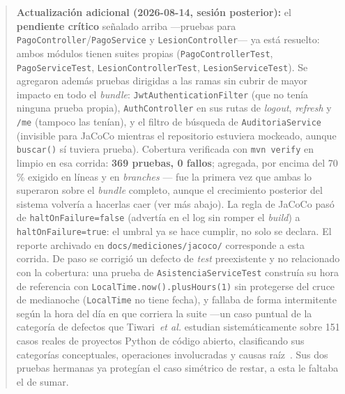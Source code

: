 \documentclass[11pt,a4paper]{article}
\newcommand{\ruta}[1]{\texttt{\footnotesize #1}}
\begin{document}
\begin{quote}
\textbf{Actualización adicional (2026-08-14, sesión posterior):} el
\textbf{pendiente crítico} señalado arriba —pruebas para
\texttt{PagoController}/\texttt{PagoService} y \texttt{LesionController}—
ya está resuelto: ambos módulos tienen suites propias
(\texttt{PagoControllerTest}, \texttt{PagoServiceTest},
\texttt{LesionControllerTest}, \texttt{LesionServiceTest}). Se agregaron
además pruebas dirigidas a las ramas sin cubrir de mayor impacto en todo
el \emph{bundle}: \texttt{JwtAuthenticationFilter} (que no tenía ninguna
prueba propia), \texttt{AuthController} en sus rutas de \emph{logout},
\emph{refresh} y \texttt{/me} (tampoco las tenían), y el filtro de
búsqueda de \texttt{AuditoriaService} (invisible para JaCoCo mientras el
repositorio estuviera mockeado, aunque \texttt{buscar()} sí tuviera
prueba). Cobertura verificada con \texttt{mvn verify} en limpio en esa corrida:
\textbf{369 pruebas, 0 fallos}; agregada, por encima del 70\,\% exigido
en líneas y en \emph{branches} — fue la primera vez que ambas lo
superaron sobre el \emph{bundle} completo, aunque el crecimiento
posterior del sistema volvería a hacerlas caer (ver más abajo). La
regla de JaCoCo pasó de \texttt{haltOnFailure=false} (advertía en el
log sin romper el \emph{build}) a \texttt{haltOnFailure=true}: el
umbral ya se hace cumplir, no solo se declara. El reporte archivado en
\ruta{docs/mediciones/jacoco/} corresponde a esta corrida. De paso se
corrigió un defecto de \emph{test} preexistente y no relacionado con la
cobertura: una prueba de \texttt{AsistenciaServiceTest} construía su hora
de referencia con \texttt{LocalTime.now().plusHours(1)} sin protegerse
del cruce de medianoche (\texttt{LocalTime} no tiene fecha), y fallaba de
forma intermitente según la hora del día en que corriera la suite —un
caso puntual de la categoría de defectos que Tiwari~\emph{et al.}
estudian sistemáticamente sobre 151 casos reales de proyectos Python de
código abierto, clasificando sus categorías conceptuales, operaciones
involucradas y causas raíz~\cite{tiwari2025datetime}. Sus
dos pruebas hermanas ya protegían el caso simétrico de restar, a esta le
faltaba el de sumar.


\end{quote}
\end{document}

